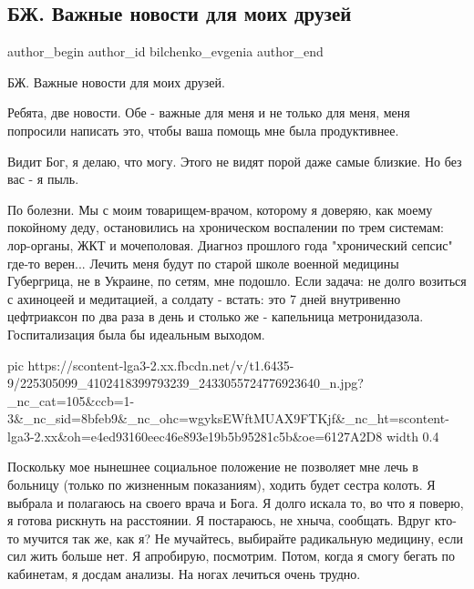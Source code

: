  
 
 
 
 
 
\subsection{БЖ. Важные новости для моих друзей}
\label{sec:29_07_2021.fb.bilchenko_evgenia.1.novosti_druzja}
 
\ifcmt
 author_begin
   author_id bilchenko_evgenia
 author_end
\fi

БЖ. Важные новости для моих друзей.

Ребята, две новости. Обе - важные для меня и не только для меня, меня попросили
написать это, чтобы ваша помощь мне была продуктивнее. 

Видит Бог, я делаю, что
могу. Этого не видят порой даже самые близкие. Но без вас - я пыль.

По болезни. Мы с моим товарищем-врачом, которому я доверяю, как моему покойному
деду, остановились на хроническом воспалении по трем системам: лор-органы, ЖКТ
и мочеполовая. Диагноз прошлого года "хронический сепсис" где-то верен...
Лечить меня будут по старой школе военной медицины Губергрица, не в Украине, по
сетям, мне подошло. Если задача: не долго возиться с ахиноцеей и медитацией, а
солдату - встать: это 7 дней внутривенно цефтриаксон по два раза в день и
столько же - капельница метронидазола. Госпитализация была бы идеальным
выходом. 

\ifcmt
  pic https://scontent-lga3-2.xx.fbcdn.net/v/t1.6435-9/225305099_4102418399793239_2433055724776923640_n.jpg?_nc_cat=105&ccb=1-3&_nc_sid=8bfeb9&_nc_ohc=wgyksEWftMUAX9FTKjf&_nc_ht=scontent-lga3-2.xx&oh=e4ed93160eec46e893e19b5b95281c5b&oe=6127A2D8
  width 0.4
\fi

Поскольку мое нынешнее социальное положение не позволяет мне лечь в больницу
(только по жизненным показаниям), ходить будет сестра колоть. Я выбрала и
полагаюсь на своего врача и Бога. Я долго искала то, во что я поверю, я готова
рискнуть на расстоянии. Я постараюсь, не хныча, сообщать. Вдруг кто-то мучится
так же, как я? Не мучайтесь, выбирайте радикальную медицину, если сил жить
больше нет. Я апробирую, посмотрим. Потом, когда я смогу бегать по кабинетам, я
досдам анализы. На ногах лечиться очень трудно.

